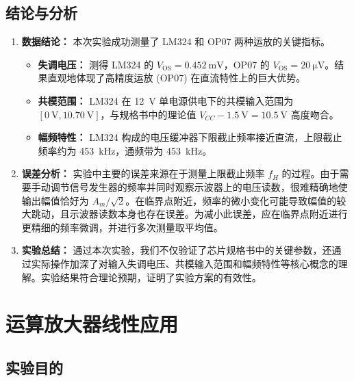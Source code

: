 \documentclass[UTF8, a4paper]{ctexrep} %
\begin{document}
\section{结论与分析}\label{sec:opamp_conclusion}
\begin{enumerate}
    \item \textbf{数据结论：} 本次实验成功测量了 LM324 和 OP07 两种运放的关键指标。
    \begin{itemize}
        \item \textbf{失调电压：} 测得 LM324 的 $V_{\text{OS}} = \SI{0.452}{\milli\volt}$，OP07 的 $V_{\text{OS}} = \SI{20}{\micro\volt}$。结果直观地体现了高精度运放 (OP07) 在直流特性上的巨大优势。
        \item \textbf{共模范围：} LM324 在 \SI{12}{\volt} 单电源供电下的共模输入范围为 $[\SI{0}{\volt}, \SI{10.70}{\volt}]$，与规格书中的理论值 $V_{CC} - \SI{1.5}{\volt} = \SI{10.5}{\volt}$ 高度吻合。
        \item \textbf{幅频特性：} LM324 构成的电压缓冲器下限截止频率接近直流，上限截止频率约为 \SI{453}{\kilo\hertz}，通频带为 \SI{453}{\kilo\hertz}。
    \end{itemize}
    
    \item \textbf{误差分析：} 实验中主要的误差来源在于测量上限截止频率 $f_H$ 的过程。由于需要手动调节信号发生器的频率并同时观察示波器上的电压读数，很难精确地使输出幅值恰好为 $A_m/\sqrt{2}$。在临界点附近，频率的微小变化可能导致幅值的较大跳动，且示波器读数本身也存在误差。为减小此误差，应在临界点附近进行更精细的频率微调，并进行多次测量取平均值。
    
    \item \textbf{实验总结：} 通过本次实验，我们不仅验证了芯片规格书中的关键参数，还通过实际操作加深了对输入失调电压、共模输入范围和幅频特性等核心概念的理解。实验结果符合理论预期，证明了实验方案的有效性。
\end{enumerate}




\chapter{运算放大器线性应用}
\label{chap:exp4}

\section{实验目的}
\end{document}
